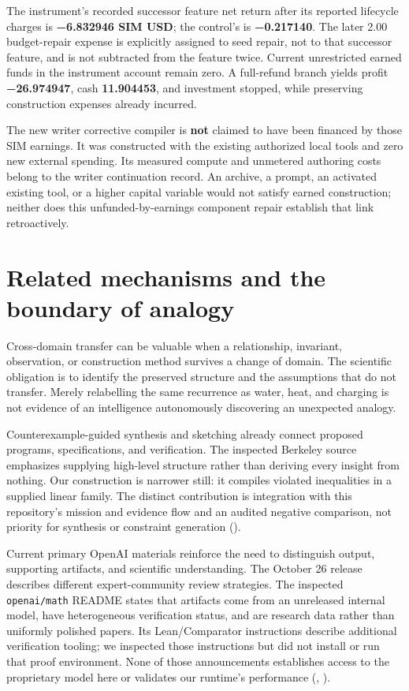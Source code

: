 The instrument's recorded successor feature net return after its
reported lifecycle charges is \textbf{−6.832946 SIM USD}; the control's
is \textbf{−0.217140}. The later 2.00 budget-repair expense is
explicitly assigned to seed repair, not to that successor feature, and
is not subtracted from the feature twice. Current unrestricted earned
funds in the instrument account remain zero. A full-refund branch yields
profit \textbf{−26.974947}, cash \textbf{11.904453}, and investment
stopped, while preserving construction expenses already incurred.

The new writer corrective compiler is \textbf{not} claimed to have been
financed by those SIM earnings. It was constructed with the existing
authorized local tools and zero new external spending. Its measured
compute and unmetered authoring costs belong to the writer continuation
record. An archive, a prompt, an activated existing tool, or a higher
capital variable would not satisfy earned construction; neither does
this unfunded-by-earnings component repair establish that link
retroactively.

\section{Related mechanisms and the boundary of
analogy}\label{related-work}

Cross-domain transfer can be valuable when a relationship, invariant,
observation, or construction method survives a change of domain. The
scientific obligation is to identify the preserved structure and the
assumptions that do not transfer. Merely relabelling the same recurrence
as water, heat, and charging is not evidence of an intelligence
autonomously discovering an unexpected analogy.

Counterexample-guided synthesis and sketching already connect proposed
programs, specifications, and verification. The inspected Berkeley
source emphasizes supplying high-level structure rather than deriving
every insight from nothing. Our construction is narrower still: it
compiles violated inequalities in a supplied linear family. The distinct
contribution is integration with this repository's mission and evidence
flow and an audited negative comparison, not priority for synthesis or
constraint generation ().

Current primary OpenAI materials reinforce the need to distinguish
output, supporting artifacts, and scientific understanding. The October
26 release describes different expert-community review strategies. The
inspected \texttt{openai/math} README states that artifacts come from an
unreleased internal model, have heterogeneous verification status, and
are research data rather than uniformly polished papers. Its
Lean/Comparator instructions describe additional verification tooling;
we inspected those instructions but did not install or run that proof
environment. None of those announcements establishes access to the
proprietary model here or validates our runtime's performance
(,
).

